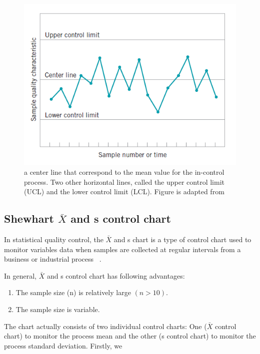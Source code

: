 \begin{figure}[h]
\centering
\includegraphics[width=1\textwidth]{images/control_chart.PNG}
\caption[A typical control chart.]{a center line that correspond to the mean value for the in-control process. Two other horizontal lines, called the upper control limit (UCL) and the lower control limit (LCL). Figure is adapted from ~\cite{montgomery2020introduction}}
\label{fig:control_chart}
\end{figure}

\subsection{Shewhart $\bar{X}$ and s control chart}
In statistical quality control, the $\bar{X}$ and s chart is a type of control chart used to monitor variables data when samples are collected at regular intervals from a business or industrial process ~\cite{heckert2002handbook}. 

In general, $\bar{X}$ and s control chart has following advantages:
\begin{enumerate}
    \item The sample size (n) is relatively large $(n>10)$.
    \item The sample size is variable.
\end{enumerate}

The chart actually consists of two individual control charts: One ($\bar{X}$ control chart) to monitor the process mean and the other (s control chart) to monitor the process standard deviation. Firstly, we 








